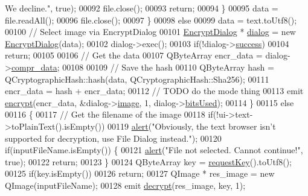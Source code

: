 \begin{DoxyCode}
{       We decline."}, \textcolor{keyword}{true});
00092                 file.close();
00093                 \textcolor{keywordflow}{return};
00094             \}
00095             data = file.readAll();
00096             file.close();
00097         \}
00098         \textcolor{keywordflow}{else}
00099             data = text.toUtf8();
00100         \textcolor{comment}{// Select image via EncryptDialog}
00101         \hyperlink{class_encrypt_dialog}{EncryptDialog} * \hyperlink{class_view_p_c_a31abbb470fe329b44e6ffee202b903ca}{dialog} = \textcolor{keyword}{new} \hyperlink{class_encrypt_dialog}{EncryptDialog}(data);
00102         dialog->exec();
00103         \textcolor{keywordflow}{if}(!dialog->\hyperlink{class_encrypt_dialog_ada4900bcd40894d9c098c65aa4066ac9}{success})
00104             \textcolor{keywordflow}{return};
00105 
00106         \textcolor{comment}{// Get the data}
00107         QByteArray encr\_data = dialog->\hyperlink{class_encrypt_dialog_a3e8998aa39696cbd1242f6420ef18143}{compr\_data};
00108 
00109         \textcolor{comment}{// Save the hash}
00110         QByteArray hash = QCryptographicHash::hash(data, QCryptographicHash::Sha256);
00111         encr\_data = hash + encr\_data;
00112         \textcolor{comment}{// TODO do the mode thing}
00113         emit \hyperlink{class_view_p_c_a27ecfb84029d42029631b776a02ff5d8}{encrypt}(encr\_data, &dialog->\hyperlink{class_encrypt_dialog_a739a0df1d28d06b28a3fd16e2bc16c73}{image}, 1, dialog->\hyperlink{class_encrypt_dialog_abf638fea37fbdbaba215954e2e239860}{bitsUsed});
00114     \}
00115     \textcolor{keywordflow}{else}
00116     \{
00117         \textcolor{comment}{// Get the filename of the image}
00118         \textcolor{keywordflow}{if}(!ui->text->toPlainText().isEmpty())
00119             \hyperlink{class_view_p_c_a7c467169467789561078abc9d4fe57bd}{alert}(\textcolor{stringliteral}{"Obviously, the text browser isn't supported for decryption, use File Dialog
       instead."});
00120         \textcolor{keywordflow}{if}(inputFileName.isEmpty()) \{
00121             \hyperlink{class_view_p_c_a7c467169467789561078abc9d4fe57bd}{alert}(\textcolor{stringliteral}{"File not selected. Cannot continue!"}, \textcolor{keyword}{true});
00122             \textcolor{keywordflow}{return};
00123         \}
00124         QByteArray key = \hyperlink{class_view_p_c_a559c95675ec98b15451f3bca47033d9c}{requestKey}().toUtf8();
00125         \textcolor{keywordflow}{if}(key.isEmpty())
00126             \textcolor{keywordflow}{return};
00127         QImage * res\_image = \textcolor{keyword}{new} QImage(inputFileName);
00128         emit \hyperlink{class_view_p_c_a365df051360d557c7221474ad856e0af}{decrypt}(res\_image, key, 1);

\end{DoxyCode}

